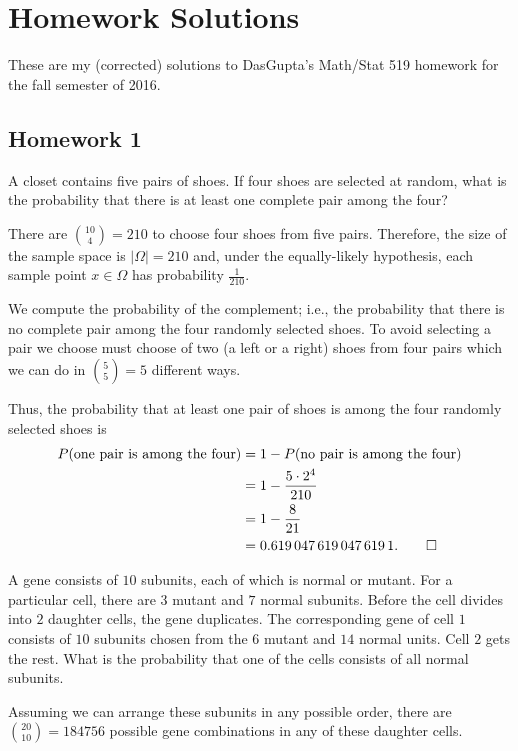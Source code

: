 \section{Homework Solutions}
These are my (corrected) solutions to DasGupta's Math/Stat 519 homework for
the fall semester of 2016.
\subsection{Homework 1}
\begin{problem}[Handout 1, \# 5]
  A closet contains five pairs of shoes. If four shoes are selected at
  random, what is the probability that there is at least one complete pair
  among the four?
\end{problem}
\begin{solution*}
  There are \(\binom{10}{4}=210\) to choose four shoes from five
  pairs. Therefore, the size of the sample space is \(|\Omega|=210\) and,
  under the equally-likely hypothesis, each sample point \(x\in\Omega\) has
  probability \(\frac{1}{210}\).

  We compute the probability of the complement; i.e., the probability that
  there is no complete pair among the four randomly selected shoes. To
  avoid selecting a pair we choose must choose of two (a left or a right)
  shoes from four pairs which we can do in \(\binom{5}{5}=5\) different
  ways.

  Thus, the probability that at least one pair of shoes is among the four
  randomly selected shoes is
  \begin{align*}
    P(\text{one pair is among the four})
    &=1-P(\text{no pair is among the four})\\
    &=1-\frac{5\cdot 2^4}{210}\\
    &=1-\frac{8}{21}\\
    &=\num{0.6190476190476191}.\qedhere
  \end{align*}
\end{solution*}

\begin{problem}[Handout 1, \# 7]
  A gene consists of \(10\) subunits, each of which is normal or
  mutant. For a particular cell, there are \(3\) mutant and \(7\) normal
  subunits. Before the cell divides into \(2\) daughter cells, the gene
  duplicates. The corresponding gene of cell \(1\) consists of \(10\)
  subunits chosen from the \(6\) mutant and \(14\) normal units. Cell \(2\)
  gets the rest. What is the probability that one of the cells consists of
  all normal subunits.
\end{problem}
\begin{solution*}
  Assuming we can arrange these subunits in any possible order, there are
  \(\binom{20}{10}=\num{184756}\) possible gene combinations in any of
  these daughter cells.
\end{solution*}

